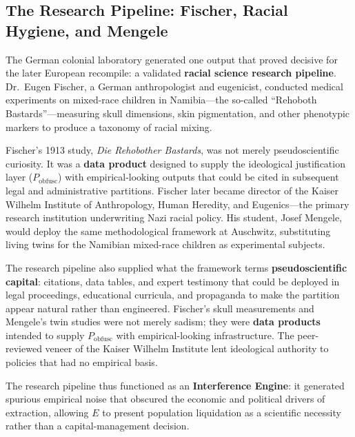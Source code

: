 \subsection{The Research Pipeline: Fischer, Racial Hygiene, and Mengele}

The German colonial laboratory generated one output that proved decisive for the later European recompile: a validated \textbf{racial science research pipeline}. Dr.\ Eugen Fischer, a German anthropologist and eugenicist, conducted medical experiments on mixed-race children in Namibia---the so-called ``Rehoboth Bastards''---measuring skull dimensions, skin pigmentation, and other phenotypic markers to produce a taxonomy of racial mixing.

Fischer's 1913 study, \textit{Die Rehobother Bastards}, was not merely pseudoscientific curiosity. It was a \textbf{data product} designed to supply the ideological justification layer ($P_{\text{obfusc}}$) with empirical-looking outputs that could be cited in subsequent legal and administrative partitions. Fischer later became director of the Kaiser Wilhelm Institute of Anthropology, Human Heredity, and Eugenics---the primary research institution underwriting Nazi racial policy. His student, Josef Mengele, would deploy the same methodological framework at Auschwitz, substituting living twins for the Namibian mixed-race children as experimental subjects.

The research pipeline also supplied what the framework terms \textbf{pseudoscientific capital}: citations, data tables, and expert testimony that could be deployed in legal proceedings, educational curricula, and propaganda to make the partition appear natural rather than engineered. Fischer's skull measurements and Mengele's twin studies were not merely sadism; they were \textbf{data products} intended to supply $P_{\text{obfusc}}$ with empirical-looking infrastructure. The peer-reviewed veneer of the Kaiser Wilhelm Institute lent ideological authority to policies that had no empirical basis.

The research pipeline thus functioned as an \textbf{Interference Engine}: it generated spurious empirical noise that obscured the economic and political drivers of extraction, allowing $E$ to present population liquidation as a scientific necessity rather than a capital-management decision.

